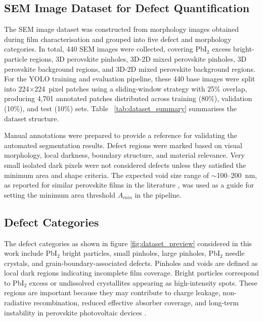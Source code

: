 \documentclass[pdflatex,sn-mathphys-num,iicol]{sn-jnl}
\theoremstyle{thmstyleone}
\theoremstyle{thmstyletwo}
\theoremstyle{thmstylethree}
\begin{document}
\subsection{SEM Image Dataset for Defect Quantification}
\label{subsec:sem_dataset}

The SEM image dataset was constructed from morphology images obtained
during film characterisation and grouped into five defect and
morphology categories. In total, 440 SEM images were collected,
covering PbI$_2$ excess bright-particle regions, 3D perovskite
pinholes, 3D-2D mixed perovskite pinholes, 3D perovskite background
regions, and 3D-2D mixed perovskite background regions. For the YOLO
training and evaluation pipeline, these 440 base images were split
into 224$\times$224~pixel patches using a sliding-window strategy with
25\% overlap, producing 4{,}701 annotated patches distributed across
training (80\%), validation (10\%), and test (10\%) sets.
Table ~\ref{tab:dataset_summary} summarises the dataset structure.


Manual annotations were prepared to provide a reference for validating
the automated segmentation results. Defect regions were marked based
on visual morphology, local darkness, boundary structure, and material
relevance. Very small isolated dark pixels were not considered defects
unless they satisfied the minimum area and shape criteria. The
expected void size range of $\sim$100--200~nm, as reported for similar
perovskite films in the literature \cite{chang2026}, was used as a
guide for setting the minimum area threshold $A_{min}$ in the pipeline.

\subsection{Defect Categories}\label{subsec:defect_categories}

The defect categories as shown in figure \ref{fig:dataset_preview} considered in this work include PbI$_2$ bright
particles, small pinholes, large pinholes, PbI$_2$ needle crystals,
and grain-boundary-associated defects. Pinholes and voids are defined
as local dark regions indicating incomplete film coverage. Bright
particles correspond to PbI$_2$ excess or undissolved crystallites
appearing as high-intensity spots. These regions are important because
they may contribute to charge leakage, non-radiative recombination,
reduced effective absorber coverage, and long-term instability in
perovskite photovoltaic devices \cite{chang2026,hu2023}.
\end{document}
